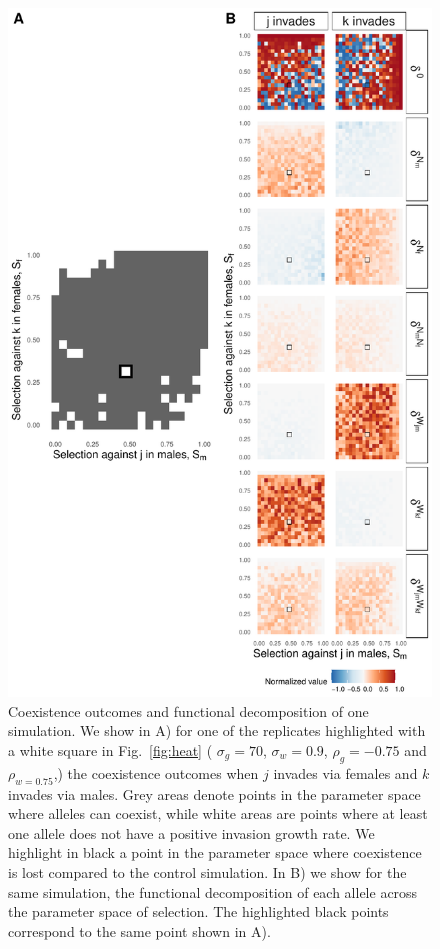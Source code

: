 \documentclass[12pt]{article}
\begin{document}
\begin{figure}[H]
  \centerline{\includegraphics[height=0.9\textheight]{outcomes.pdf}}
  \caption{Coexistence outcomes and functional decomposition of one simulation. We show in A) for one of the replicates highlighted with a white square in Fig.~\ref{fig:heat} ( $\sigma_{g} = 70$, $\sigma_{w}= 0.9$, $\rho_{g}=-0.75$ and $\rho_{w= 0.75}$,) the coexistence outcomes when $j$ invades via females and $k$ invades via males. Grey areas denote points in the parameter space where alleles can coexist, while white areas are points where at least one allele does not have a positive invasion growth rate. We highlight in black a point in the parameter space where coexistence is lost compared to the control simulation. In B) we show for the same simulation, the functional decomposition of each allele across the parameter space of selection. The highlighted black points correspond to the same point shown in A).    }
    \label{fig:outcomes}
\end{figure}
\end{document}
